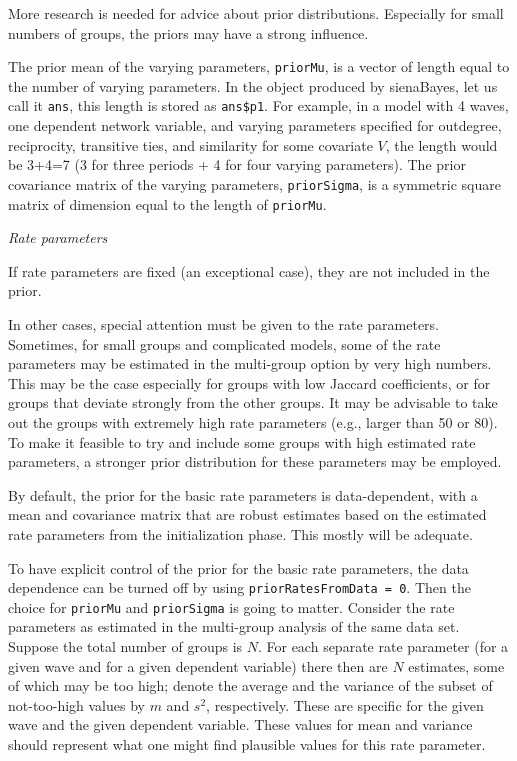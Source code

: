 \documentclass[a4paper,fleqn,11pt]{article}
\newcommand{\+}{\, + \,}
\newcommand{\sfn}[1]{\textsf{#1}}
\begin{document}
More research is needed for advice about prior distributions.
Especially for small numbers of groups, the priors may have a strong influence.
\medskip

The prior mean of the varying parameters,
\texttt{priorMu}, is a vector of length equal to the number of varying parameters.
In the object produced by \sfn{sienaBayes}, let us call it \texttt{ans},
this length is stored as \texttt{ans\$p1}.
For example, in a model with 4 waves, one dependent network variable,
and varying parameters specified for outdegree, reciprocity,
transitive ties, and similarity for some covariate $V$,
the length would be 3+4=7 (3 for three periods +
4 for four varying parameters).
The prior covariance matrix of the varying parameters,
\texttt{priorSigma}, is a symmetric square matrix of dimension
equal to the length of \texttt{priorMu}.
\medskip

\noindent
\emph{Rate parameters}
\smallskip

\noindent
If rate parameters are fixed (an exceptional case), they are
not included in the prior.

In other cases, special attention must be given to the rate parameters.
Sometimes, for small groups and complicated models, some of the
rate parameters may be estimated in the multi-group option by very high
numbers. This may be the case especially for groups with low Jaccard
coefficients, or for groups that deviate strongly from the other groups.
It may be advisable to take out the groups with extremely high
rate parameters (e.g., larger than 50 or 80).
To make it feasible to try and include some groups with high estimated rate
parameters, a stronger prior distribution for these parameters may be employed.

By default, the prior for the basic rate parameters is data-dependent,
with a mean and covariance matrix that are robust estimates
based on the estimated rate parameters from the initialization phase.
This mostly will be adequate.

To have explicit control of the prior for the basic rate parameters,
the data dependence can be turned off by using
\texttt{priorRatesFromData = 0}.
Then the choice for \texttt{priorMu} and \texttt{priorSigma}
is going to matter.
Consider the rate parameters as estimated in the multi-group analysis
of the same data set.
Suppose the total number of groups is $N$.
For each separate rate parameter (for a given wave
and for a given dependent variable) there then are $N$ estimates,
some of which may be too high; denote the average and the variance
of the subset of not-too-high values by $m$ and $s^2$, respectively.
These are specific for the  given wave and the given dependent variable.
These values for mean and variance should
represent what one might find plausible values for this rate parameter.
\end{document}

